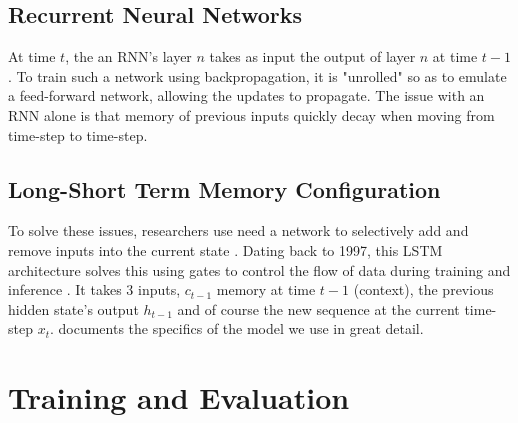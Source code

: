 \documentclass[12pt]{article}
\begin{document}
\subsection{Recurrent Neural Networks}

At time $t$, the an RNN's layer $n$ takes as input the output of layer $n$ at
time $t-1$. To train such a network using backpropagation, it is "unrolled" so
as to emulate a feed-forward network, allowing the updates to propagate. The
issue with an RNN alone is that memory of previous inputs quickly decay when
moving from time-step to time-step. 

\subsection{Long-Short Term Memory Configuration}

To solve these issues, researchers use need a network to selectively add and
remove inputs into the current state \parencite{zhang2019dive}. Dating back to
1997, this LSTM architecture solves this using gates to control the flow of data
during training and inference \parencite{zhang2019dive}. It takes 3 inputs,
$c_{t-1}$ memory at time $t-1$ (context), the previous hidden state's output
$h_{t-1}$ and of course the new sequence at the current time-step $x_t$.
\citeauthor[12]{singh2018teaching} documents the specifics of the model we use
in great detail.

\section{Training and Evaluation}
\end{document}
